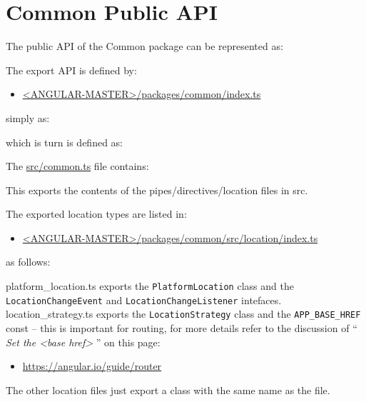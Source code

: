 \section{Common Public API}

The public API of the Common package can be represented as:

The export API is defined by:

\begin{itemize}
  \item \href{https://github.com/angular/angular/blob/master/packages/common/index.ts}
        {<ANGULAR-MASTER>/packages/common/index.ts}
\end{itemize}

simply as:



which is turn is defined as:



The
\url{src/common.ts}
file contains:



This exports the contents of the pipes/directives/location files in src.

The exported location types are listed in:

\begin{itemize}
  \item \href{https://github.com/angular/angular/blob/master/packages/common/src/location/index.ts}
        {<ANGULAR-MASTER>/packages/common/src/location/index.ts}
\end{itemize}

as follows:



platform\_location.ts exports the
\texttt{PlatformLocation}
class and the
\texttt{LocationChangeEvent}
and
\texttt{LocationChangeListener}
intefaces. location\_strategy.ts
exports the
\texttt{LocationStrategy}
class and the
\texttt{APP\_BASE\_HREF}
const – this is important
for routing, for more details refer to the discussion of “
\emph{Set the <base href>}
” on this
page:

\begin{itemize}
  \item \url{https://angular.io/guide/router}
\end{itemize}

The other location files just export a class with the same name as the file.
